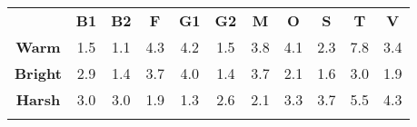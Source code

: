 \begin{tabular}{|c||c|c|c|c|c|c|c|c|c|c|}
	\cline{2-11}
	\multicolumn{1}{c|}{} & \bf{B1} & \bf{B2} & \bf{F} & \bf{G1} & \bf{G2} & \bf{M} & \bf{O} & \bf{S} & \bf{T} & \bf{V} \tabularnewline
	\hhline{~|-|-|-|-|-|-|-|-|-|-|}
	\noalign{\vspace{\doublerulesep}}
	\hhline{-||-|-|-|-|-|-|-|-|-|-|}
	\bf{Warm} & 1.5 & 1.1 & 4.3 & 4.2 & 1.5 & 3.8 & 4.1 & 2.3 & 7.8 & 3.4 \tabularnewline
	\hhline{-||-|-|-|-|-|-|-|-|-|-|}
	\bf{Bright} & 2.9 & 1.4 & 3.7 & 4.0 & 1.4 & 3.7 & 2.1 & 1.6 & 3.0 & 1.9 \tabularnewline
	\hhline{-||-|-|-|-|-|-|-|-|-|-|}
	\bf{Harsh} & 3.0 & 3.0 & 1.9 & 1.3 & 2.6 & 2.1 & 3.3 & 3.7 & 5.5 & 4.3 \tabularnewline
	\hhline{-||-|-|-|-|-|-|-|-|-|-|}
\end{tabular}
